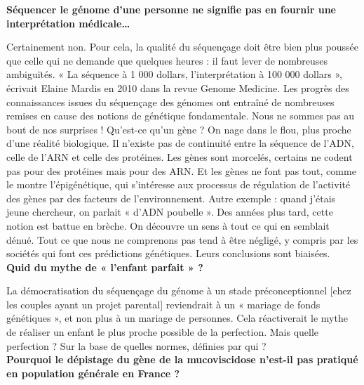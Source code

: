 \documentclass[8pt]{article}
\begin{document}
\textbf{Séquencer le génome d’une personne ne signifie pas en fournir une interprétation médicale…}

Certainement non. Pour cela, la qualité du séquençage doit être bien plus poussée que celle qui ne demande que quelques heures : il faut lever de nombreuses ambiguïtés. « La séquence à 1 000 dollars, l’interprétation à 100 000 dollars », écrivait Elaine Mardis en 2010 dans la revue Genome Medicine. Les progrès des connaissances issues du séquençage des génomes ont entraîné de nombreuses remises en cause des notions de génétique fondamentale. Nous ne sommes pas au bout de nos surprises ! Qu’est-ce qu’un gène ? On nage dans le flou, plus proche d’une réalité biologique. Il n’existe pas de continuité entre la séquence de l’ADN, celle de l’ARN et celle des protéines. Les gènes sont morcelés, certains ne codent pas pour des protéines mais pour des ARN. Et les gènes ne font pas tout, comme le montre l’épigénétique, qui s’intéresse aux processus de régulation de l’activité des gènes par des facteurs de l’environnement. Autre exemple : quand j’étais jeune chercheur, on parlait « d’ADN poubelle ». Des années plus tard, cette notion est battue en brèche. On découvre un sens à tout ce qui en semblait dénué. Tout ce que nous ne comprenons pas tend à être négligé, y compris par les sociétés qui font ces prédictions génétiques. Leurs conclusions sont biaisées. \\

\textbf{Quid du mythe de « l’enfant parfait » ?}

La démocratisation du séquençage du génome à un stade préconceptionnel [chez les couples ayant un projet parental] reviendrait à un « mariage de fonds génétiques », et non plus à un mariage de personnes. Cela réactiverait le mythe de réaliser un enfant le plus proche possible de la perfection. Mais quelle perfection ? Sur la base de quelles normes, définies par qui ? \\

\textbf{Pourquoi le dépistage du gène de la mucoviscidose n’est-il pas pratiqué en population générale en France ?}
\end{document}
